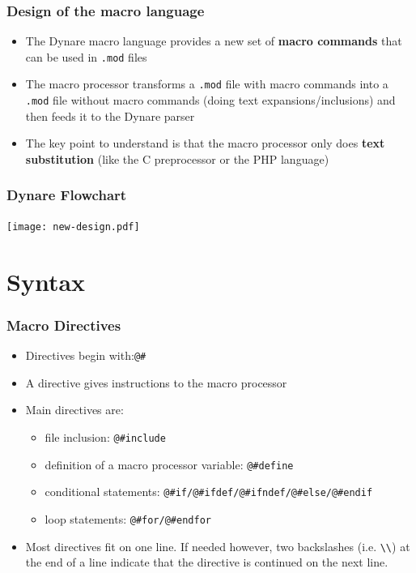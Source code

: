 \documentclass{beamer}
\begin{document}
\begin{frame}
  \frametitle{Design of the macro language}
  \begin{itemize}
  \item The Dynare macro language provides a new set of \textbf{macro commands} that can be used in \texttt{.mod} files
  \item The macro processor transforms a \texttt{.mod} file with macro commands into a \texttt{.mod} file without macro commands (doing text expansions/inclusions) and then feeds it to the Dynare parser
  \item The key point to understand is that the macro processor only does \textbf{text substitution} (like the C preprocessor or the PHP language)
  \end{itemize}
\end{frame}

\begin{frame}
  \frametitle{Dynare Flowchart}
  \texttt{[image: new-design.pdf]}
\end{frame}

\section{Syntax}

\begin{frame}[fragile=singleslide]
  \frametitle{Macro Directives}
  \begin{itemize}
  \item Directives begin with:\verb+@#+
  \item A directive gives instructions to the macro processor
  \item Main directives are:
    \begin{itemize}
    \item file inclusion: \verb+@#include+
    \item definition of a macro processor variable: \verb+@#define+
    \item conditional statements: \verb+@#if/@#ifdef/@#ifndef/@#else/@#endif+
    \item loop statements: \verb+@#for/@#endfor+
    \end{itemize}
  \item Most directives fit on one line. If needed however, two backslashes (i.e. \verb+\\+) at the end of a line indicate that the directive is continued on the next line.
  \end{itemize}
\end{frame}
\end{document}
